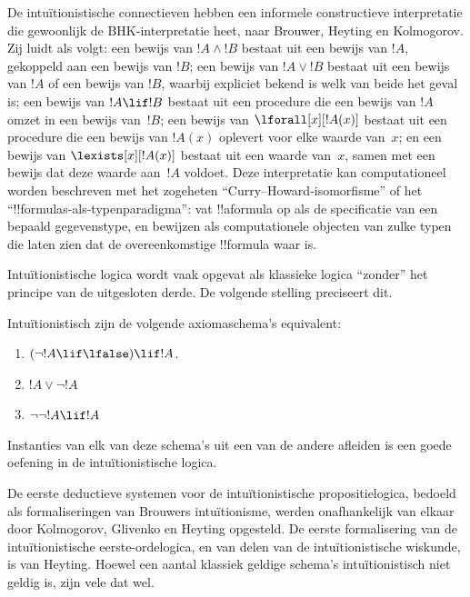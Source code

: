 \documentclass[openany]{memoir}
\begin{document}
De intuïtionistische connectieven hebben een informele constructieve
interpretatie die gewoonlijk de BHK-interpretatie heet, naar Brouwer, Heyting en
Kolmogorov. Zij luidt als volgt: een bewijs van $!A \land !B$ bestaat uit een
bewijs van $!A$, gekoppeld aan een bewijs van $!B$; een bewijs van $!A \lor !B$
bestaat uit een bewijs van $!A$ of een bewijs van $!B$, waarbij expliciet bekend
is welk van beide het geval is; een bewijs van $!A \lif !B$ bestaat uit een
procedure die een bewijs van $!A$ omzet in een bewijs van~$!B$; een bewijs van
$\lforall[x][!A(x)]$ bestaat uit een procedure die een bewijs van $!A(x)$
oplevert voor elke waarde van~$x$; en een bewijs van $\lexists[x][!A(x)]$ bestaat uit
een waarde van~$x$, samen met een bewijs dat deze waarde aan~$!A$ voldoet. Deze
interpretatie kan computationeel worden beschreven met het zogeheten
``Curry--Howard-isomorfisme'' of het ``!!{formula}s-als-typenparadigma'': vat
!!a{formula} op als de specificatie van een bepaald gegevenstype, en bewijzen als
computationele objecten van zulke typen die laten zien dat de overeenkomstige
!!{formula} waar is.

Intuïtionistische logica wordt vaak opgevat als klassieke logica ``zonder'' het
principe van de uitgesloten derde. De volgende stelling preciseert dit.
\begin{thm}
Intuïtionistisch zijn de volgende axiomaschema's equivalent:
\begin{enumerate}
\item $(\lnot !A \lif \lfalse) \lif !A$.
\item $!A \lor \lnot !A$
\item $\lnot \lnot !A \lif !A$
\end{enumerate}
\end{thm}
Instanties van elk van deze schema's uit een van de andere afleiden is een goede
oefening in de intuïtionistische logica.

De eerste deductieve systemen voor de intuïtionistische propositielogica, bedoeld
als formaliseringen van Brouwers intuïtionisme, werden onafhankelijk van elkaar
door Kolmogorov, Glivenko en Heyting opgesteld. De eerste formalisering van de
intuïtionistische eerste-ordelogica, en van delen van de intuïtionistische
wiskunde, is van Heyting. Hoewel een aantal klassiek geldige schema's
intuïtionistisch niet geldig is, zijn vele dat wel.
\end{document}
